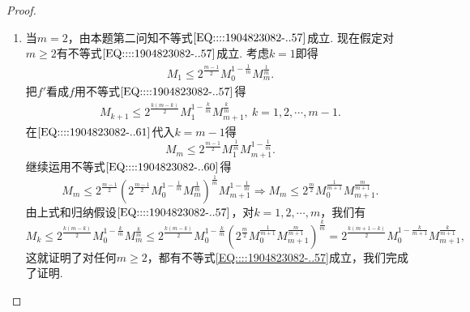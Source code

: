 \documentclass[../../main.tex]{subfiles}%
\begin{document}
\begin{proof}
\begin{enumerate}
\item 当\( m = 2 \)，由本题第二问知不等式\(\eqref{EQ::::1904823082-..57}\)成立. 现在假定对\( m \geqslant 2 \)有不等式\(\eqref{EQ::::1904823082-..57}\)成立. 考虑\( k = 1 \)即得
\begin{align}
M_1 \leqslant 2^{\frac{m - 1}{2}} M_0^{1 - \frac{1}{m}} M_m^{\frac{1}{m}}. \label{EQ::::1904823082-..60}
\end{align}
把\( f' \)看成\( f \)用不等式\(\eqref{EQ::::1904823082-..57}\)得
\begin{align}
M_{k + 1} \leqslant 2^{\frac{k(m - k)}{2}} M_1^{1 - \frac{k}{m}} M_{m + 1}^{\frac{k}{m}}, \ k = 1,2,\cdots, m - 1. \label{EQ::::1904823082-..61}
\end{align}
在\(\eqref{EQ::::1904823082-..61}\)代入\( k = m - 1 \)得
\[
M_m \leqslant 2^{\frac{m - 1}{2}} M_1^{\frac{1}{m}} M_{m + 1}^{1 - \frac{1}{m}}.
\]
继续运用不等式\(\eqref{EQ::::1904823082-..60}\)得
\[
M_m \leqslant 2^{\frac{m - 1}{2}} \left( 2^{\frac{m - 1}{2}} M_0^{1 - \frac{1}{m}} M_m^{\frac{1}{m}} \right)^{\frac{1}{m}} M_{m + 1}^{1 - \frac{1}{m}} \Rightarrow M_m \leqslant 2^{\frac{m}{2}} M_0^{\frac{1}{m + 1}} M_{m + 1}^{\frac{m}{m + 1}}.
\]
由上式和归纳假设\(\eqref{EQ::::1904823082-..57}\)，对\( k = 1,2,\cdots, m \)，我们有
\[
M_k \leqslant 2^{\frac{k(m - k)}{2}} M_0^{1 - \frac{k}{m}} M_m^{\frac{k}{m}} \leqslant 2^{\frac{k(m - k)}{2}} M_0^{1 - \frac{k}{m}} \left( 2^{\frac{m}{2}} M_0^{\frac{1}{m + 1}} M_{m + 1}^{\frac{m}{m + 1}} \right)^{\frac{k}{m}} = 2^{\frac{k(m + 1 - k)}{2}} M_0^{1 - \frac{k}{m + 1}} M_{m + 1}^{\frac{k}{m + 1}},
\]
这就证明了对任何\( m \geqslant 2 \)，都有不等式\eqref{EQ::::1904823082-..57}成立，我们完成了证明.
\end{enumerate}

\end{proof}
\end{document}
